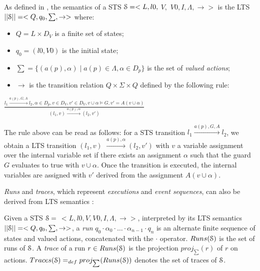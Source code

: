 \begin{definition}
    As defined in \cite{FTW05}, the semantics of a STS
    $\EuScript{S}=<L,l0,$ $V,$ $V0, I,\Lambda,\rightarrow>$ is
    the LTS $||\EuScript{S}||=<Q,q_0,\sum,\rightarrow>$ where:

	\begin{itemize}

        \item $Q=L \times D_V$ is a finite set of states;

        \item $q_0=(l0,V0)$ is the initial state;

        \item $\sum=\{(a(p),\alpha)  \mid  a(p)\in\Lambda, \alpha
            \in D_p\}$ is the set of \emph{valued actions};

        \item $\rightarrow$ is the transition relation $Q \times
            \Sigma \times Q$ defined by the following rule:\\
	\end{itemize}
    \begin{center}
    {\Large
    $\frac{l_1 \xrightarrow{a(p),G,A}l_2,\alpha \in D_p, v \in D_V, v'
        \in D_V, v \cup \alpha \models G, v'=A(v \cup \alpha)}{(l_1,v)
            \xrightarrow{a(p),\alpha} (l_2,v') }$
    }
	\end{center}

	\label{def:semantics}
\end{definition}

The rule above can be read as follows: for a STS transition $l_1
\xrightarrow{a(p),G,A}l_2$, we obtain a LTS transition $(l_1,v)$
$\xrightarrow{a(p),\alpha} (l_2,v')$ with $v$ a variable
assignment over the internal variable set if there exists an
assignment $\alpha$ such that the guard $G$ evaluates to true
with $v \cup \alpha$. Once the transition is executed, the
internal variables are assigned with $v'$ derived from the
assignment $A(v \cup \alpha)$.

\emph{Runs} and \emph{traces}, which represent \emph{executions}
and \emph{event sequences}, can also be derived from LTS
semantics \cite{jeron2006model}:

\begin{definition}
    Given a STS $\EuScript{S}=$ $<L,l0,V,V0,I,\Lambda,
    \rightarrow>$, interpreted by its LTS semantics
    $||\EuScript{S}||=<Q,q_0,\sum,\rightarrow>$, a \emph{run}
    $q_0 \cdot \alpha_0 \cdot \dots \cdot \alpha_{n-1} \cdot q_n$
    is an alternate finite sequence of states and valued actions,
    concatenated with the $\cdot$ operator. $Runs(\EuScript{S})$
    is the set of runs of $\EuScript{S}$.
    A \emph{trace} of a run $r \in Runs(\EuScript{S})$ is the
    projection $proj_{\sum}(r)$ of $r$ on actions.
    $Traces(\EuScript{S}) =_{def} proj_{\sum}(Runs(\EuScript{S}))$
    denotes the set of traces of $\EuScript{S}$.

    \label{def:runs-and-traces}
\end{definition}

